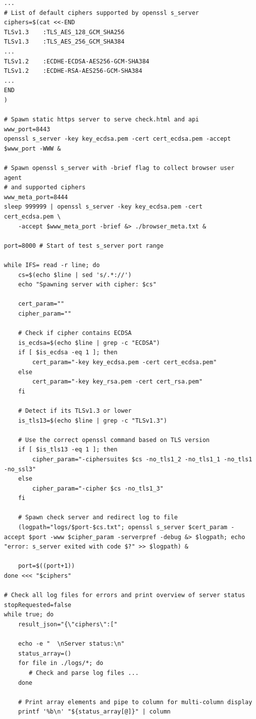 \documentclass[12pt]{scrbook}
\begin{document}
\begin{verbatim}
...
# List of default ciphers supported by openssl s_server
ciphers=$(cat <<-END
TLSv1.3    :TLS_AES_128_GCM_SHA256
TLSv1.3    :TLS_AES_256_GCM_SHA384
...
TLSv1.2    :ECDHE-ECDSA-AES256-GCM-SHA384
TLSv1.2    :ECDHE-RSA-AES256-GCM-SHA384
...
END
)

# Spawn static https server to serve check.html and api
www_port=8443
openssl s_server -key key_ecdsa.pem -cert cert_ecdsa.pem -accept $www_port -WWW &

# Spawn openssl s_server with -brief flag to collect browser user agent
# and supported ciphers
www_meta_port=8444
sleep 999999 | openssl s_server -key key_ecdsa.pem -cert cert_ecdsa.pem \
    -accept $www_meta_port -brief &> ./browser_meta.txt &

port=8000 # Start of test s_server port range

while IFS= read -r line; do
    cs=$(echo $line | sed 's/.*://')
    echo "Spawning server with cipher: $cs"

    cert_param=""
    cipher_param=""

    # Check if cipher contains ECDSA
    is_ecdsa=$(echo $line | grep -c "ECDSA")
    if [ $is_ecdsa -eq 1 ]; then
        cert_param="-key key_ecdsa.pem -cert cert_ecdsa.pem"
    else
        cert_param="-key key_rsa.pem -cert cert_rsa.pem"
    fi

    # Detect if its TLSv1.3 or lower
    is_tls13=$(echo $line | grep -c "TLSv1.3")

    # Use the correct openssl command based on TLS version
    if [ $is_tls13 -eq 1 ]; then
        cipher_param="-ciphersuites $cs -no_tls1_2 -no_tls1_1 -no_tls1 -no_ssl3"
    else
        cipher_param="-cipher $cs -no_tls1_3"
    fi

    # Spawn check server and redirect log to file
    (logpath="logs/$port-$cs.txt"; openssl s_server $cert_param -accept $port -www $cipher_param -serverpref -debug &> $logpath; echo "error: s_server exited with code $?" >> $logpath) &

    port=$((port+1))
done <<< "$ciphers"

# Check all log files for errors and print overview of server status
stopRequested=false
while true; do
    result_json="{\"ciphers\":["

    echo -e "  \nServer status:\n"
    status_array=()
    for file in ./logs/*; do
       # Check and parse log files ...
    done

    # Print array elements and pipe to column for multi-column display
    printf '%b\n' "${status_array[@]}" | column


\end{verbatim}
\end{document}
